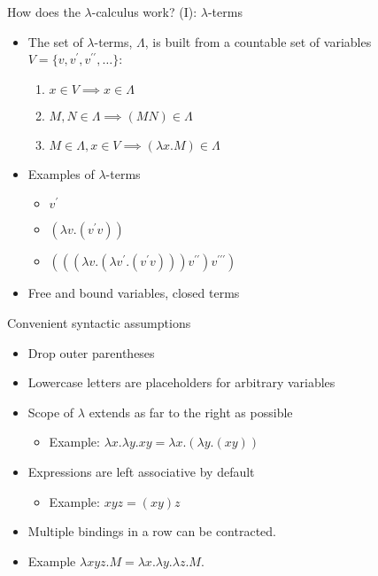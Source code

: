 \documentclass{beamer}
\begin{document}
\begin{frame}{How does the $\lambda$-calculus work? (I): $\lambda$-terms}
\begin{itemize}
\item The set of $\lambda$-terms, $\Lambda$, is built from a countable set of variables $V = \{v, v^\prime, v^{\prime\prime}, \ldots\}$:
\begin{enumerate}
\item $x \in V \implies x \in \Lambda$
\item $M,N \in \Lambda \implies (MN) \in \Lambda$
\item $M \in \Lambda, x\in V \implies (\lambda x . M) \in \Lambda$
\end{enumerate}
\item{Examples of $\lambda$-terms}
\begin{itemize}
\item $v^\prime$
\item $(\lambda v. (v^\prime v))$
\item $(((\lambda v. (\lambda v^\prime . (v^\prime v))) v^{\prime\prime}) v^{\prime\prime\prime})$
\end{itemize}
\item Free and bound variables, closed terms
\end{itemize}
\end{frame}

\begin{frame}{Convenient syntactic assumptions}
\begin{itemize}
\item Drop outer parentheses
\item Lowercase letters are placeholders for arbitrary variables
\item Scope of $\lambda$ extends as far to the right as possible
\begin{itemize}
\item Example: $\lambda x . \lambda y . x y = \lambda x . (\lambda y . (x y))$
\end{itemize}
\item Expressions are left associative by default
\begin{itemize}
\item Example: $xyz = (x y) z$
\end{itemize}
\item Multiple bindings in a row can be contracted.
\item Example $\lambda xyz.M = \lambda x. \lambda y. \lambda z. M$.
\end{itemize}
\end{frame}
\end{document}
